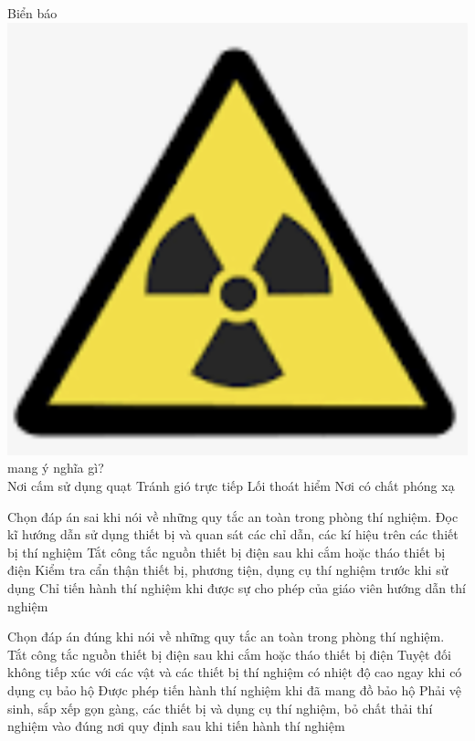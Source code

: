 \begin{ex}
	Biển báo \vspace{-0.5cm}\includegraphics[scale=0.2]{figs/G10Y25B1-6} mang ý nghĩa gì?\\
	\choice
	{Nơi cấm sử dụng quạt}
	{Tránh gió trực tiếp}
	{Lối thoát hiểm}
	{\True Nơi có chất phóng xạ}
	\loigiai{}
\end{ex}

\begin{ex}
	Chọn đáp án sai khi nói về những quy tắc an toàn trong phòng thí nghiệm.
	\choice
	{Đọc kĩ hướng dẫn sử dụng thiết bị và quan sát các chỉ dẫn, các kí hiệu trên các thiết bị thí nghiệm}
	{\True Tắt công tắc nguồn thiết bị điện sau khi cắm hoặc tháo thiết bị điện}
	{Kiểm tra cẩn thận thiết bị, phương tiện, dụng cụ thí nghiệm trước khi sử dụng}
	{Chỉ tiến hành thí nghiệm khi được sự cho phép của giáo viên hướng dẫn thí nghiệm}
	\loigiai{}
\end{ex}

\begin{ex}
	Chọn đáp án đúng khi nói về những quy tắc an toàn trong phòng thí nghiệm.
	\choice
	{Tắt công tắc nguồn thiết bị điện sau khi cắm hoặc tháo thiết bị điện}
	{Tuyệt đối không tiếp xúc với các vật và các thiết bị thí nghiệm có nhiệt độ cao ngay khi có dụng cụ bảo hộ}
	{Được phép tiến hành thí nghiệm khi đã mang đồ bảo hộ}
	{\True Phải vệ sinh, sắp xếp gọn gàng, các thiết bị và dụng cụ thí nghiệm, bỏ chất thải thí nghiệm vào đúng nơi quy định sau khi tiến hành thí nghiệm}
	\loigiai{}
\end{ex}

